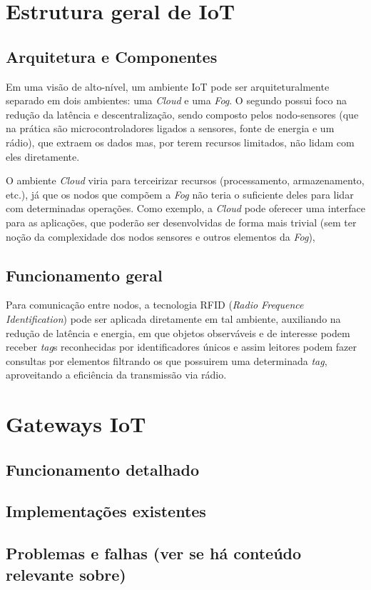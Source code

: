 \documentclass{report}
\title{\todo{A gente descobre depois}}
\author{João Gabriel Trombeta\\
        João Paulo Taylor Ienczak Zanette\\
        Ranieri Schroeder Althoff}
\date{\today}
\newcommand{\todo}[1]{{\color{red} #1}}
\begin{document}
\maketitle

\tableofcontents

\chapter{Estrutura geral de IoT}

\section{Arquitetura e Componentes}

Em uma visão de alto-nível, um ambiente IoT pode ser arquiteturalmente separado
em dois ambientes: uma \textit{Cloud} e uma \textit{Fog}. O segundo possui foco
na redução da latência e descentralização, sendo composto pelos nodo-sensores
(que na prática são microcontroladores ligados a sensores, fonte de energia e
um rádio), que extraem os dados mas, por terem recursos limitados, não lidam
com eles diretamente.

O ambiente \textit{Cloud} viria para terceirizar recursos (processamento,
armazenamento, etc.), já que os nodos que compõem a \textit{Fog} não teria o
suficiente deles para lidar com determinadas operações. Como exemplo, a
\textit{Cloud} pode oferecer uma interface para as aplicações, que poderão ser
desenvolvidas de forma mais trivial (sem ter noção da complexidade dos nodos
sensores e outros elementos da \textit{Fog}),

\section{Funcionamento geral}

Para comunicação entre nodos, a tecnologia RFID (\textit{Radio Frequence
Identification}) pode ser aplicada diretamente em tal ambiente, auxiliando na
redução de latência e energia, em que objetos observáveis e de interesse podem
receber \textit{tag}s reconhecidas por identificadores únicos e assim leitores
podem fazer consultas por elementos filtrando os que possuirem uma determinada
\textit{tag}, aproveitando a eficiência da transmissão via rádio.

\chapter{Gateways IoT}

\section{Funcionamento detalhado}

\section{Implementações existentes}

\section{Problemas e falhas \todo{(ver se há conteúdo relevante sobre)}}


\nocite{*}

\end{document}
